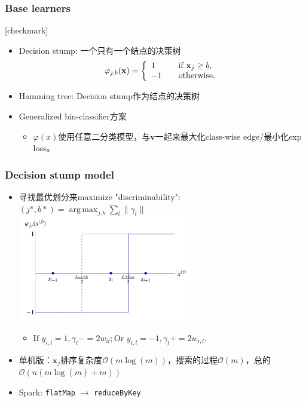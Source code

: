 \documentclass{beamer}
\DeclareMathOperator*{\argmax}{arg\,max}
\begin{document}
\begin{frame}
\frametitle{Base learners}
{
  [checkmark]
  \begin{itemize}
    \item Decision stump: 一个只有一个结点的决策树
       $$ \varphi_{j,b}(\mathbf{x}) = \left\{
            \begin{array}{l l}
              1 & \quad \text{if } \mathbf{x}_j \geq b, \\
             -1 & \quad \text{otherwise.}
            \end{array} \right.$$
    \item Hamming tree: Decision stump作为结点的决策树
    \item Generalized bin-classifier方案
      \begin{itemize}
        \item $\varphi(x)$使用任意二分类模型，与$\mathbf{v}$一起来最大化class-wise edge/最小化exp loss。
      \end{itemize}
  \end{itemize}
}
\end{frame}

\begin{frame}
\frametitle{Decision stump model}
  \begin{itemize}
    \item 寻找最优划分来maximize "discriminability": $(j*,b*) = \argmax_{j,b} \sum_{l}\| \gamma_l \|$
    \includegraphics[width=0.6\textwidth]{img/ds_split.png}
    \begin{itemize}
      \item $\text{If } y_{i,l}=1, \gamma_l -= 2w_{il}; \text{Or } y_{i,l}=-1, \gamma_l += 2w_{i,l}.$
    \end{itemize}
    \item 单机版：$\mathbf{x}_j$排序复杂度$\mathcal{O}(m\log(m))$，搜索的过程$\mathcal{O}(m)$，总的$\mathcal{O}(n(m\log(m) + m))$
    \item Spark: {\color{blue} \texttt{flatMap} $\rightarrow$ \texttt{reduceByKey}}
  \end{itemize}
\end{frame}
\end{document}
